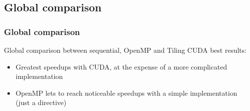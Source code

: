 \documentclass[xcolor=table]{beamer}
\begin{document}

\subsection{Global comparison}

\begin{frame}
\frametitle{Global comparison}

Global comparison between sequential, OpenMP and Tiling CUDA best results:
\vspace{0.25cm}
\begin{itemize}
\item Greatest speedups with CUDA, at the expense of a more complicated implementation
\vspace{0.15cm}
\item OpenMP lets to reach noticeable speedups with a simple implementation (just a directive)
\end{itemize}
\vspace{0.25cm}

\centering
\begin{table}[]
\caption{$\dagger$ times have been estimated with a quadratic regression}
\label{tab:globalComparison}
\end{table}
\end{frame}

\end{document}
